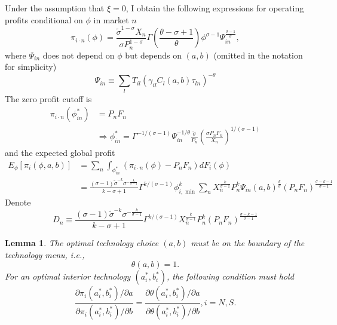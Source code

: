 \documentclass[notitlepage,11pt]{article}%
\newtheorem{lemma}{Lemma}
\begin{document}
Under the assumption that $\xi=0$, I obtain the following expressions for
operating profits conditional on $\phi$ in market $n$
\[
\pi_{i\cdot n}\left(  \phi\right)  =\frac{\tilde{\sigma}^{1-\sigma}X_{n}%
}{\sigma P_{n}^{1-\sigma}}\Gamma\left(  \frac{\theta-\sigma+1}{\theta}\right)
\phi^{\sigma-1}\Psi_{in}^{\frac{\sigma-1}{\theta}},
\]
where $\Psi_{in}$ does not depend on $\phi$ but depends on $\left(
a,b\right)  $ (omitted in the notation for simplicity)%
\[
\Psi_{in}\equiv\sum_{l}T_{il}\left(  \gamma_{il}C_{l}\left(  a,b\right)
\tau_{ln}\right)  ^{-\theta}%
\]
The zero profit cutoff is%
\begin{align*}
\pi_{i\cdot n}\left(  \phi_{in}^{\ast}\right)   &  =P_{n}F_{n}\\
&  \Rightarrow\phi_{in}^{\ast}=\Gamma^{-1/\left(  \sigma-1\right)  }\Psi
_{in}^{-1/\theta}\frac{\tilde{\sigma}}{P_{n}}\left(  \frac{\sigma P_{n}F_{n}%
}{X_{n}}\right)  ^{1/\left(  \sigma-1\right)  }%
\end{align*}
and the expected global profit%
\begin{align*}
E_{\phi}\left[  \pi_{i}\left(  \phi,a,b\right)  \right]   &  =\sum_{n}%
\int_{\phi_{in}^{\ast}}\left(  \pi_{i\cdot n}\left(  \phi\right)  -P_{n}%
F_{n}\right)  dF_{i}\left(  \phi\right) \\
&  =\frac{\left(  \sigma-1\right)  \tilde{\sigma}^{-k}\sigma^{-\frac{k}%
{\sigma-1}}}{k-\sigma+1}\Gamma^{k/\left(  \sigma-1\right)  }\phi_{i,\min}%
^{k}\sum_{n}X_{n}^{\frac{k}{\sigma-1}}P_{n}^{k}\Psi_{in}\left(  a,b\right)
^{\frac{k}{\theta}}\left(  P_{n}F_{n}\right)  ^{\frac{\sigma-k-1}{\sigma-1}}%
\end{align*}
Denote%
\[
D_{n}\equiv\frac{\left(  \sigma-1\right)  \tilde{\sigma}^{-k}\sigma^{-\frac
{k}{\sigma-1}}}{k-\sigma+1}\Gamma^{k/\left(  \sigma-1\right)  }X_{n}^{\frac
{k}{\sigma-1}}P_{n}^{k}\left(  P_{n}F_{n}\right)  ^{\frac{\sigma-k-1}%
{\sigma-1}}%
\]


\begin{lemma}
The optimal technology choice $\left(  a,b\right)  $ must be on the boundary
of the technology menu, i.e.,%
\[
\theta\left(  a,b\right)  =1.
\]
For an optimal interior technology $\left(  a_{i}^{\ast},b_{i}^{\ast}\right)
$, the following condition must hold%
\[
\frac{\partial\pi_{i}\left(  a_{i}^{\ast},b_{i}^{\ast}\right)  /\partial
a}{\partial\pi_{i}\left(  a_{i}^{\ast},b_{i}^{\ast}\right)  /\partial b}%
=\frac{\partial\theta\left(  a_{i}^{\ast},b_{i}^{\ast}\right)  /\partial
a}{\partial\theta\left(  a_{i}^{\ast},b_{i}^{\ast}\right)  /\partial
b},i=N,S.
\]

\end{lemma}
\end{document}
